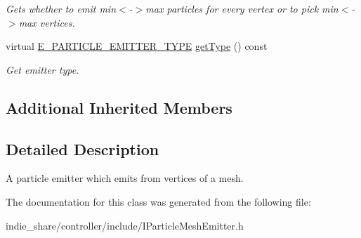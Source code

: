 \begin{DoxyCompactItemize}
\begin{DoxyCompactList}\small\item\em Gets whether to emit min$<$-\/$>$max particles for every vertex or to pick min$<$-\/$>$max vertices. \end{DoxyCompactList}\item 
\mbox{\label{classirr_1_1scene_1_1IParticleMeshEmitter_acb0b3f4c04c12da20e3503773aa2eb2c}} 
virtual \hyperlink{namespaceirr_1_1scene_a3e251a881c886884a78adea2e546272b}{E\+\_\+\+P\+A\+R\+T\+I\+C\+L\+E\+\_\+\+E\+M\+I\+T\+T\+E\+R\+\_\+\+T\+Y\+PE} \hyperlink{classirr_1_1scene_1_1IParticleMeshEmitter_acb0b3f4c04c12da20e3503773aa2eb2c}{get\+Type} () const
\begin{DoxyCompactList}\small\item\em Get emitter type. \end{DoxyCompactList}\end{DoxyCompactItemize}
\subsection*{Additional Inherited Members}


\subsection{Detailed Description}
A particle emitter which emits from vertices of a mesh. 

The documentation for this class was generated from the following file\+:\begin{DoxyCompactItemize}
\item 
indie\+\_\+share/controller/include/I\+Particle\+Mesh\+Emitter.\+h\end{DoxyCompactItemize}
